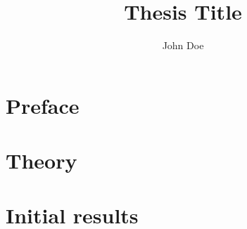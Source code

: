 \documentclass[twoside,chapterprefix,11pt, a4paper,footinclude=true,headinclude=true,cleardoublepage=empty,BCOR=5mm]{scrbook}
\title{Thesis Title}
\author{John Doe}
\begin{document}
\frenchspacing
\raggedbottom
{} %
\pagestyle{plain}






\pagestyle{scrheadings}
\chapter{Preface}


\chapter{Theory}


\chapter{Initial results}

\appendix



\end{document}

